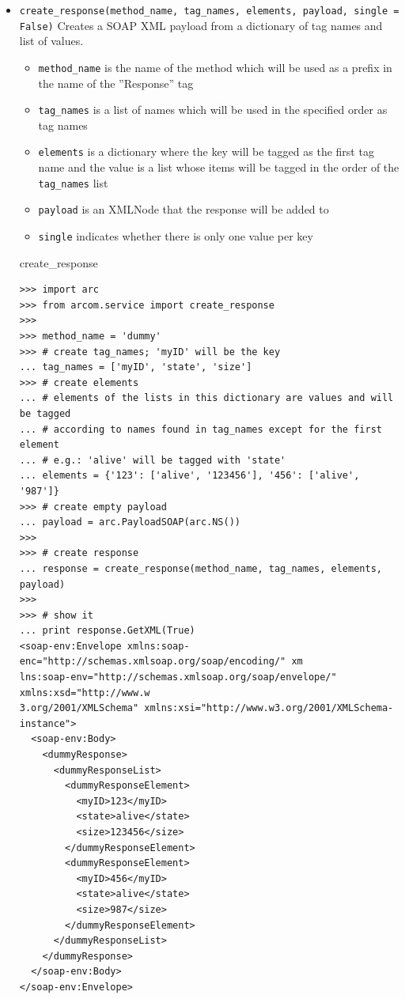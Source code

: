 \documentclass{article}
\begin{document}
\begin{flushleft}
\begin{itemize}
  \item{ \verb$create_response(method_name, tag_names, elements, payload, single = False)$ \linebreak
  Creates a SOAP XML payload from a dictionary of tag names and list of values.
  \begin{itemize}
    \item{\verb$method_name$ is the name of the method which will be used as a prefix in the name of the ''Response'' tag}
    \item{\verb$tag_names$ is a list of names which will be used in the specified order as tag names}
    \item{\verb$elements$ is a dictionary where the key will be tagged as the first tag name 
and the value is a list whose items will be tagged in the order of the \verb$tag_names$ list}
    \item{\verb$payload$ is an XMLNode that the response will be added to}
    \item{\verb$single$ indicates whether there is only one value per key}
  \end{itemize}  
    \begin{example}
      \caption{create\_response}\label{crespex}
\begin{verbatim}
>>> import arc
>>> from arcom.service import create_response
>>> 
>>> method_name = 'dummy'
>>> # create tag_names; 'myID' will be the key
... tag_names = ['myID', 'state', 'size']
>>> # create elements
... # elements of the lists in this dictionary are values and will be tagged 
... # according to names found in tag_names except for the first element
... # e.g.: 'alive' will be tagged with 'state'
... elements = {'123': ['alive', '123456'], '456': ['alive', '987']}
>>> # create empty payload
... payload = arc.PayloadSOAP(arc.NS())
>>> 
>>> # create response
... response = create_response(method_name, tag_names, elements, payload)
>>> 
>>> # show it
... print response.GetXML(True)
<soap-env:Envelope xmlns:soap-enc="http://schemas.xmlsoap.org/soap/encoding/" xm
lns:soap-env="http://schemas.xmlsoap.org/soap/envelope/" xmlns:xsd="http://www.w
3.org/2001/XMLSchema" xmlns:xsi="http://www.w3.org/2001/XMLSchema-instance">
  <soap-env:Body>
    <dummyResponse>
      <dummyResponseList>
        <dummyResponseElement>
          <myID>123</myID>
          <state>alive</state>
          <size>123456</size>
        </dummyResponseElement>
        <dummyResponseElement>
          <myID>456</myID>
          <state>alive</state>
          <size>987</size>
        </dummyResponseElement>
      </dummyResponseList>
    </dummyResponse>
  </soap-env:Body>
</soap-env:Envelope>
\end{verbatim}
    \end{example}
  }
\end{itemize}


\end{flushleft}
\end{document}
